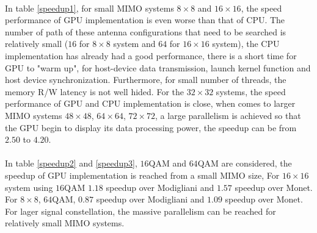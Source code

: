 \documentclass[12pt,a4paper,final]{article}
\begin{document}
\begin{spacing}{2.5}
\paragraph{} In table \ref{speedup1}, for small MIMO systems $8\times 8$ and $16\times 16$, the speed performance of GPU implementation is even worse than that of CPU. The number of path of these antenna configurations that need to be searched is relatively small ($16$ for $8\times 8$ system and $64$ for $16\times 16$ system), the CPU implementation has already had a good performance, there is a short time for GPU to "warm up", for host-device data transmission, launch kernel function and host device synchronization. Furthermore, for small number of threads, the memory R/W latency is not well hided. For the $32\times 32$ systems, the speed performance of GPU and CPU implementation is close, when comes to larger MIMO systems $48\times 48$, $64\times 64$, $72\times 72$, a large parallelism is achieved so that the GPU begin to display its data processing power, the speedup can be from $2.50$ to $4.20$. 
\paragraph{}In table \ref{speedup2} and \ref{speedup3}, $16$QAM and $64$QAM are considered, the speedup of GPU implementation is reached from a small MIMO size, For $16\times 16$ system using $16$QAM $1.18$ speedup over Modigliani and $1.57$ speedup over Monet. For $8\times 8$, $64$QAM, $0.87$ speedup over Modigliani and $1.09$ speedup over Monet.  For lager signal constellation, the massive parallelism can be reached for relatively small MIMO systems.

\end{spacing}
\end{document}

